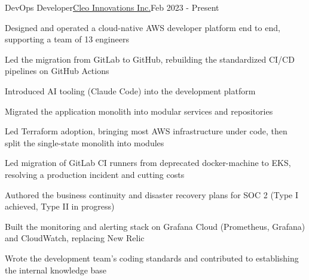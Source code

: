 \begin{joblong}{DevOps Developer}{\href{https://www.cleo.eco}{Cleo Innovations Inc.}}{Feb 2023 - Present}
\item Designed and operated a cloud-native AWS developer platform end to end, supporting a team of 13 engineers
\item Led the migration from GitLab to GitHub, rebuilding the standardized CI/CD pipelines on GitHub Actions
\item Introduced AI tooling (Claude Code) into the development platform
\item Migrated the application monolith into modular services and repositories
\item Led Terraform adoption, bringing most AWS infrastructure under code, then split the single-state monolith into modules
\item Led migration of GitLab CI runners from deprecated docker-machine to EKS, resolving a production incident and cutting costs
\item Authored the business continuity and disaster recovery plans for SOC 2 (Type I achieved, Type II in progress)
\item Built the monitoring and alerting stack on Grafana Cloud (Prometheus, Grafana) and CloudWatch, replacing New Relic
\item Wrote the development team's coding standards and contributed to establishing the internal knowledge base
\end{joblong}
